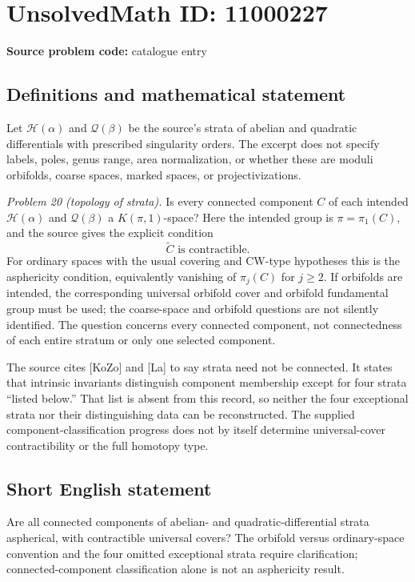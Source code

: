 \documentclass[11pt]{article}
\begin{document}
\section*{UnsolvedMath ID: 11000227}
\textbf{Source problem code:} catalogue entry
\subsection{Definitions and mathematical statement}
Let \(\mathcal H(\alpha)\) and \(\mathcal Q(\beta)\) be the source's strata of abelian and quadratic differentials with prescribed singularity orders. The excerpt does not specify labels, poles, genus range, area normalization, or whether these are moduli orbifolds, coarse spaces, marked spaces, or projectivizations.

\emph{Problem 20 (topology of strata).} Is every connected component \(C\) of each intended \(\mathcal H(\alpha)\) and \(\mathcal Q(\beta)\) a \(K(\pi,1)\)-space? Here the intended group is \(\pi=\pi_1(C)\), and the source gives the explicit condition
\[
 \widetilde C\text{ is contractible}.
\]
For ordinary spaces with the usual covering and CW-type hypotheses this is the asphericity condition, equivalently vanishing of \(\pi_j(C)\) for \(j\geq2\). If orbifolds are intended, the corresponding universal orbifold cover and orbifold fundamental group must be used; the coarse-space and orbifold questions are not silently identified. The question concerns every connected component, not connectedness of each entire stratum or only one selected component.

The source cites [KoZo] and [La] to say strata need not be connected. It states that intrinsic invariants distinguish component membership except for four strata ``listed below.'' That list is absent from this record, so neither the four exceptional strata nor their distinguishing data can be reconstructed. The supplied component-classification progress does not by itself determine universal-cover contractibility or the full homotopy type.
\subsection{Short English statement}
Are all connected components of abelian- and quadratic-differential strata aspherical, with contractible universal covers? The orbifold versus ordinary-space convention and the four omitted exceptional strata require clarification; connected-component classification alone is not an asphericity result.
\end{document}

